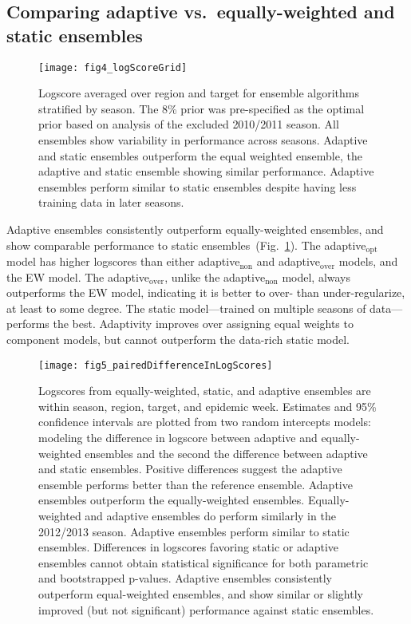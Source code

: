 \documentclass[12pt]{article}
\begin{document}
\subsection{Comparing adaptive vs.~equally-weighted and static ensembles}

\graphicspath{{../_6_TLGs/_G/fig4_logScoreGrid/}}
\begin{figure}[ht!]
  \centering
  \texttt{[image: fig4\_logScoreGrid]}
  \caption{
    Logscore averaged over region and target for ensemble algorithms stratified by season.
    The 8\% prior was pre-specified as the optimal prior based on analysis of the excluded 2010/2011 season.
    All ensembles show variability in performance across seasons. 
    Adaptive and static ensembles outperform the equal weighted ensemble, the adaptive and static ensemble showing similar performance.
    Adaptive ensembles perform similar to static ensembles despite having less training data in later seasons.
   \label{fig4.logScoresGrid}}
\end{figure}
Adaptive ensembles consistently outperform equally-weighted ensembles, and show comparable performance to static ensembles~(Fig.~\ref{fig4.logScoresGrid}).
The adaptive$_{\text{opt}}$ model has higher logscores than either adaptive$_{\text{non}}$ and adaptive$_{\text{over}}$ models, and the EW model.
The adaptive$_{\text{over}}$, unlike the adaptive$_{\text{non}}$ model, always outperforms the EW model, indicating it is better to over- than under-regularize, at least to some degree.
The static model---trained on multiple seasons of data---performs the best. 
Adaptivity improves over assigning equal weights to component models, but cannot outperform the data-rich static model. 

\graphicspath{{../_6_TLGs/_G/fig5_pairedDifferenceInLogScores/}}
\begin{figure}[ht!]
  \centering
  \texttt{[image: fig5\_pairedDifferenceInLogScores]}
  \caption{
    Logscores from equally-weighted, static, and adaptive ensembles are within season, region, target, and epidemic week.
    Estimates and 95\% confidence intervals are plotted from two random intercepts models: modeling the difference in logscore between adaptive and equally-weighted ensembles and the second the difference between adaptive and static ensembles.
    Positive differences suggest the adaptive ensemble performs better than the reference ensemble.
    Adaptive ensembles outperform the equally-weighted ensembles.
    Equally-weighted and adaptive ensembles do perform similarly in the 2012/2013 season.
    Adaptive ensembles perform similar to static ensembles.
    Differences in logscores favoring static or adaptive ensembles cannot obtain statistical significance for both parametric and bootstrapped p-values.
    Adaptive ensembles consistently outperform equal-weighted ensembles, and show similar or slightly improved (but not significant) performance against static ensembles.
    \label{fig5.pairedLogScoreDifferences}}
\end{figure}
\end{document}
